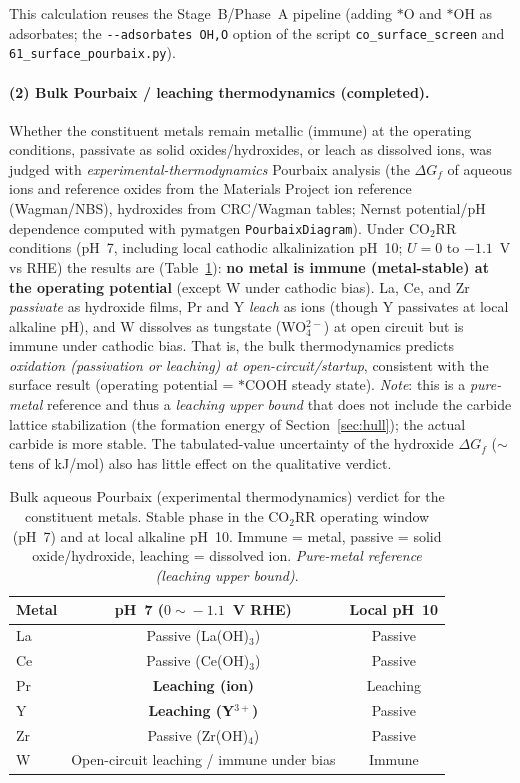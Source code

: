 \documentclass[11pt,a4paper]{report}
\begin{document}
This calculation reuses the Stage~B/Phase~A pipeline (adding $*$O and $*$OH as adsorbates; the
\texttt{-{}-adsorbates OH,O} option of the script \texttt{co\_surface\_screen} and \texttt{61\_surface\_pourbaix.py}).

\paragraph{(2) Bulk Pourbaix / leaching thermodynamics (completed).} Whether the constituent metals remain metallic (immune) at the operating
conditions, passivate as solid oxides/hydroxides, or leach as dissolved ions, was judged with \emph{experimental-thermodynamics}
Pourbaix analysis (the $\Delta G_f$ of aqueous ions and reference oxides from the Materials Project ion reference (Wagman/NBS),
hydroxides from CRC/Wagman tables; Nernst potential/pH dependence computed with pymatgen \texttt{PourbaixDiagram}). Under CO$_2$RR
conditions (pH~7, including local cathodic alkalinization pH~10; $U=0$ to $-1.1$~V vs RHE) the results are (Table~\ref{tab:pourbaix}):
\textbf{no metal is immune (metal-stable) at the operating potential} (except W under cathodic bias). La, Ce, and Zr
\emph{passivate} as hydroxide films, Pr and Y \emph{leach} as ions (though Y passivates at local alkaline pH),
and W dissolves as tungstate (WO$_4^{2-}$) at open circuit but is immune under cathodic bias. That is, the bulk thermodynamics predicts
\emph{oxidation (passivation or leaching) at open-circuit/startup}, consistent with the surface result (operating potential = $*$COOH steady state).
\emph{Note}: this is a \emph{pure-metal} reference and thus a \emph{leaching upper bound} that does not include the carbide lattice stabilization
(the formation energy of Section~\ref{sec:hull}); the actual carbide is more stable. The tabulated-value uncertainty of the hydroxide $\Delta G_f$
($\sim$tens of kJ/mol) also has little effect on the qualitative verdict.

\begin{table}[t]
\centering
\caption{Bulk aqueous Pourbaix (experimental thermodynamics) verdict for the constituent metals. Stable phase in the CO$_2$RR operating window (pH~7)
and at local alkaline pH~10. Immune = metal, passive = solid oxide/hydroxide, leaching = dissolved ion. \emph{Pure-metal reference (leaching upper bound)}.}
\label{tab:pourbaix}
\small
\begin{tabular}{lcc}
\hline
Metal & pH~7 ($0\!\sim\!-1.1$~V RHE) & Local pH~10 \\
\hline
La & Passive (La(OH)$_3$) & Passive \\
Ce & Passive (Ce(OH)$_3$) & Passive \\
Pr & \textbf{Leaching (ion)} & Leaching \\
Y  & \textbf{Leaching (Y$^{3+}$)} & Passive \\
Zr & Passive (Zr(OH)$_4$) & Passive \\
W  & Open-circuit leaching / immune under bias & Immune \\
\hline
\end{tabular}
\end{table}
\end{document}
